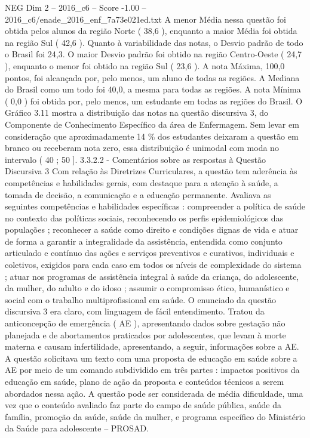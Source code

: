 \begin{textsample}{NEG Dim 2 – 2016\_c6 – Score -1.00 – 2016\_c6/enade\_2016\_enf\_7a73e021ed.txt}
A menor Média nessa questão foi obtida pelos alunos da região Norte ( 38,6 ), enquanto a maior Média foi obtida na região Sul ( 42,6 ).
Quanto à variabilidade das notas, o Desvio padrão de todo o Brasil foi 24,3.
O maior Desvio padrão foi obtido na região Centro-Oeste ( 24,7 ), enquanto o menor foi obtido na região Sul ( 23,6 ).
A nota Máxima, 100,0 pontos, foi alcançada por, pelo menos, um aluno de todas as regiões.
A Mediana do Brasil como um todo foi 40,0, a mesma para todas as regiões.
A nota Mínima ( 0,0 ) foi obtida por, pelo menos, um estudante em todas as regiões do Brasil.
O Gráfico 3.11 mostra a distribuição das notas na questão discursiva 3, do Componente de Conhecimento Específico da área de Enfermagem.
Sem levar em consideração que aproximadamente 14 \% dos estudantes deixaram a questão em branco ou receberam nota zero, essa distribuição é unimodal com moda no intervalo ( 40 ; 50 ]. 3.3.2.2 - Comentários sobre as respostas à Questão Discursiva 3 Com relação às Diretrizes Curriculares, a questão tem aderência às competências e habilidades gerais, com destaque para a atenção à saúde, a tomada de decisão, a comunicação e a educação permanente.
Avaliava as seguintes competências e habilidades específicas : compreender a política de saúde no contexto das políticas sociais, reconhecendo os perfis epidemiológicos das populações ; reconhecer a saúde como direito e condições dignas de vida e atuar de forma a garantir a integralidade da assistência, entendida como conjunto articulado e contínuo das ações e serviços preventivos e curativos, individuais e coletivos, exigidos para cada caso em todos os níveis de complexidade do sistema ; atuar nos programas de assistência integral à saúde da criança, do adolescente, da mulher, do adulto e do idoso ; assumir o compromisso ético, humanístico e social com o trabalho multiprofissional em saúde.
O enunciado da questão discursiva 3 era claro, com linguagem de fácil entendimento.
Tratou da anticoncepção de emergência ( AE ), apresentando dados sobre gestação não planejada e de abortamentos praticados por adolescentes, que levam à morte materna e causam infertilidade, apresentando, a seguir, informações sobre a AE.
A questão solicitava um texto com uma proposta de educação em saúde sobre a AE por meio de um comando subdividido em três partes : impactos positivos da educação em saúde, plano de ação da proposta e conteúdos técnicos a serem abordados nessa ação.
A questão pode ser considerada de média dificuldade, uma vez que o conteúdo avaliado faz parte do campo de saúde pública, saúde da família, promoção da saúde, saúde da mulher, e programa específico do Ministério da Saúde para adolescente – PROSAD.

\end{textsample}

